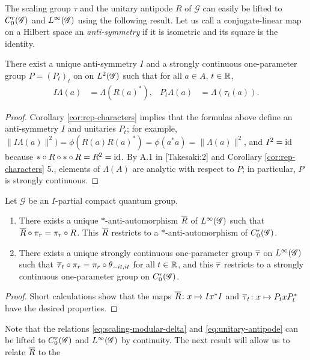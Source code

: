 The scaling group $\tau$ and the unitary antipode $R$ of $\mathscr{G}$
can easily be lifted to $C^{r}_{0}(\mathscr{G})$ and $L^{\infty}(\mathscr{G})$ using the following
result. Let us call a conjugate-linear map on a Hilbert space an
\emph{anti-symmetry} if it is isometric and its square is the
identity.
\begin{Lem} \label{lemma:vn-implementation}
  There exist a unique anti-symmetry $I$ and a strongly continuous
  one-parameter group $P=(P_{t})_{t}$ on
  on $L^{2}(\mathscr{G})$ such that for all $a\in A$, $t\in \mathbb{R}$,
  \begin{align*}
 I\Lambda(a) &=
    \Lambda(R(a)^{*}), & P_{t}\Lambda(a) &= \Lambda(\tau_{t}(a)).
  \end{align*}
\end{Lem}
\begin{proof}
  Corollary \ref{cor:rep-characters} implies that the formulas above
  define an anti-symmetry $I$ and unitaries $P_{t}$; for
  example, $\|I\Lambda(a)\|^{2})=\phi(R(a)R(a)^{*})=
  \phi(a^{*}a)=\|\Lambda(a)\|^{2}$, and $I^{2} = \operatorname{id}$
  because $*\circ R \circ * \circ R=  R^{2}=\operatorname{id}$. By A.1 in \cite{}
  [Takesaki:2] and Corollary  \ref{cor:rep-characters} 5., elements of
  $\Lambda(A)$ are analytic with respect to $P$; in
  particular,  $P$ is strongly continuous.
\end{proof}
\begin{Prop}
  Let $\mathscr{G}$ be an $I$-partial compact quantum group.  
  \begin{enumerate}
  \item  There exists a unique $*$-anti-automorphism $\overline{R}$ of
    $L^{\infty}(\mathscr{G})$ such that $\overline{R} \circ \pi_{r} = \pi_{r} \circ R$.
    This $\overline{R}$ restricts to a $*$-anti-automorphism of
    $C^{r}_{0}(\mathscr{G})$.
  \item  There exists a unique strongly continuous
    one-parameter group $\overline{\tau}$ on $L^{\infty}(\mathscr{G})$ such that $\overline{\tau}_{t}
    \circ \pi_{r} = \pi_{r} \circ \theta_{-it,it}$ for all $t\in \mathbb{R}$,
    and this $\overline{\tau}$ restricts to a strongly continuous one-parameter
    group on $C^{r}_{0}(\mathscr{G})$.
  \end{enumerate}
\end{Prop}
\begin{proof}
    Short calculations show that the maps $\overline{R} \colon x \mapsto
  Ix^{*}I$ and $\overline{\tau}_{t} \colon x \mapsto P_{t}xP_{t}^{*}$ have the
  desired properties.
\end{proof}
Note that the relations \eqref{eq:scaling-modular-delta} and
\eqref{eq:unitary-antipode} can be lifted to $C^{r}_{0}(\mathscr{G})$ and $L^{\infty}(\mathscr{G})$ by
continuity.  The next result will allow us to relate $\overline{R}$ to the
